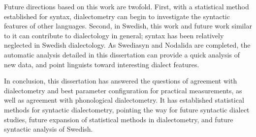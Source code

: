 Future directions based on this work are twofold. First, with a
statistical method established for syntax, dialectometry can begin to
investigate the syntactic features of other languages. Second, in
Swedish, this work and future work similar to it can contribute to
dialectology in general; syntax has been relatively neglected in
Swedish dialectology. As Swediasyn and Nodalida are completed, the
automatic analysis detailed in this dissertation can provide a quick
analysis of new data, and point linguists toward interesting dialect
features.

In conclusion, this dissertation has answered the questions of
agreement with dialectometry and best parameter configuration for
practical measurements, as well as agreement with phonological
dialectometry. It has established statistical methods for syntactic
dialectometry, pointing the way for future syntactic dialect studies,
future expansion of statistical methods in dialectometry, and future
syntactic analysis of Swedish.

